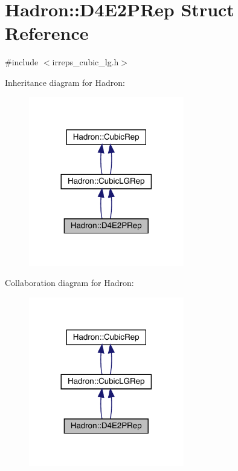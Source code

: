 \hypertarget{structHadron_1_1D4E2PRep}{}\section{Hadron\+:\+:D4\+E2\+P\+Rep Struct Reference}
\label{structHadron_1_1D4E2PRep}


{\ttfamily \#include $<$irreps\+\_\+cubic\+\_\+lg.\+h$>$}



Inheritance diagram for Hadron\+:\nopagebreak
\begin{figure}[H]
\begin{center}
\leavevmode
\includegraphics[width=192pt]{d9/d99/structHadron_1_1D4E2PRep__inherit__graph}
\end{center}
\end{figure}


Collaboration diagram for Hadron\+:\nopagebreak
\begin{figure}[H]
\begin{center}
\leavevmode
\includegraphics[width=192pt]{d5/d68/structHadron_1_1D4E2PRep__coll__graph}
\end{center}
\end{figure}
